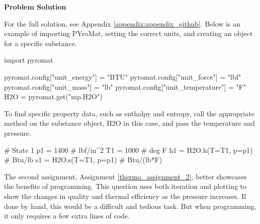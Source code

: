\begin{tcolorbox}[breakable, enhanced jigsaw, title=ME 513: Assignment \ref{thermo_assignment_1}, 
    colframe=ksu-purple, colback=ksu-gray]
    \tcblower
    \textbf{Problem Solution}
    \parindent15pt

    For the full solution, see Appendix \ref{appendix:appendix_github}. Below is an example of 
    importing PYroMat, setting the correct units, and creating an object for a specific
    substance.

\begin{python}
import pyromat

pyromat.config["unit_energy"] = "BTU"
pyromat.config["unit_force"] = "lbf"
pyromat.config["unit_mass"] = "lb"
pyromat.config["unit_temperature"] = "F"
H2O = pyromat.get("mp.H2O")
\end{python}

To find specific property data, such as enthalpy and entropy, call the appropriate method
on the substance object, H2O in this case, and pass the temperature and pressure.

\begin{python}
# State 1
p1 = 1400 # lbf/in^2
T1 = 1000 # deg F
h1 = H2O.h(T=T1, p=p1) # Btu/lb
s1 = H2O.s(T=T1, p=p1) # Btu/(lb*F)
\end{python}
\end{tcolorbox}

The second assignment, Assignment \ref{thermo_assignment_2}, better showcases the benefits of 
programming. This question uses both iteration and plotting to show the changes in quality 
and thermal efficiency as the pressure increases. If done by hand, this would be a difficult 
and tedious task. But when programming, it only requires a few extra lines of code.

\label{thermo_assignment_2}

